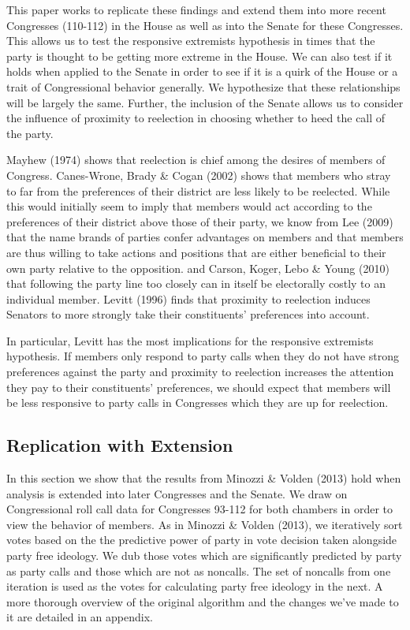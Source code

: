 \documentclass[12pt]{article}
\begin{document}
This paper works to replicate these findings and extend them into more recent Congresses (110-112) in the House as well as into the Senate for these Congresses. This allows us to test the responsive extremists hypothesis in times that the party is thought to be getting more extreme in the House. We can also test if it holds when applied to the Senate in order to see if it is a quirk of the House or a trait of Congressional behavior generally. We hypothesize that these relationships will be largely the same. Further, the inclusion of the Senate allows us to consider the influence of proximity to reelection in choosing whether to heed the call of the party.

Mayhew (1974) shows that reelection is chief among the desires of members of Congress. Canes-Wrone, Brady \& Cogan (2002) shows that members who stray to far from the preferences of their district are less likely to be reelected. While this would initially seem to imply that members would act according to the preferences of their district above those of their party, we know from Lee (2009) that the name brands of parties confer advantages on members and that members are thus willing to take actions and positions that are either beneficial to their own party relative to the opposition. and Carson, Koger, Lebo \& Young (2010) that following the party line too closely can in itself be electorally costly to an individual member. Levitt (1996) finds that proximity to reelection induces Senators to more strongly take their constituents' preferences into account.

In particular, Levitt has the most implications for the responsive extremists hypothesis. If members only respond to party calls when they do not have strong preferences against the party and proximity to reelection increases the attention they pay to their constituents' preferences, we should expect that members will be less responsive to party calls in Congresses which they are up for reelection.

\subsection{Replication with Extension}

In this section we show that the results from Minozzi \& Volden (2013) hold when analysis is extended into later Congresses and the Senate. We draw on Congressional roll call data for Congresses 93-112 for both chambers in order to view the behavior of members. As in Minozzi \& Volden (2013), we iteratively sort votes based on the the predictive power of party in vote decision taken alongside party free ideology. We dub those votes which are significantly predicted by party as party calls and those which are not as noncalls. The set of noncalls from one iteration is used as the votes for calculating party free ideology in the next. A more thorough overview of the original algorithm and the changes we've made to it are detailed in an appendix.
\end{document}
